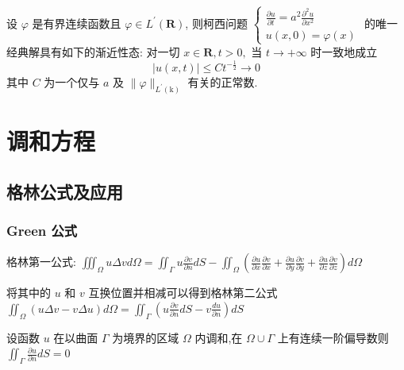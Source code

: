 \documentclass[10pt]{yerbaformat}
\begin{document}
\begin{theorem}[柯西问题解的渐进性态]
    设 $\varphi$ 是有界连续函数且 $\varphi \in L^{\prime}(\mathbf{R})$, 则柯西问题 $\left\{\begin{array}{l}\frac{\partial u}{\partial t}=a^{2} \frac{\partial^{2} u}{\partial x^{2}} \\ u(x, 0)=\varphi(x)\end{array}\right.$ 的唯一经典解具有如下的渐近性态: 对一切 $x \in \mathbf{R}, t>0,$ 当 $t \rightarrow+\infty$ 时一致地成立 $$|u(x, t)| \leqslant C t^{-\frac{1}{2}} \rightarrow 0 $$ 其中 $C$ 为一个仅与 $a$ 及 $\|\varphi\|_{L^{\prime}(\mathrm{k})}$ 有关的正常数.
\end{theorem}

\section{调和方程}

\subsection{格林公式及应用}
\subsubsection{Green 公式}

\par 格林第一公式: $\iiint_{\Omega} u \Delta v d \Omega =\iint_{\varGamma } u \frac{\partial v}{\partial n} d S-\iint_{\Omega}\left(\frac{\partial u}{\partial x} \frac{\partial v}{\partial x}+\frac{\partial u}{\partial y} \frac{\partial v}{\partial y}+\frac{\partial u}{\partial z} \frac{\partial v}{\partial z}\right) d \Omega$

\par 将其中的 $u$ 和 $v$ 互换位置并相减可以得到格林第二公式 $\iint_{\Omega}(u \Delta v-v \Delta u) d \Omega=\iint_{\Gamma}\left(u \frac{\partial v}{\partial n} d S-v \frac{d u}{\partial n}\right) d S$

\begin{theorem}
    设函数 $u$ 在以曲面 $\Gamma$ 为境界的区域 $\Omega$ 内调和,在 $\Omega \cup \Gamma$ 上有连续一阶偏导数则 $\iint_{\Gamma} \frac{\partial u}{\partial n} d S=0$
\end{theorem}

\end{document}
